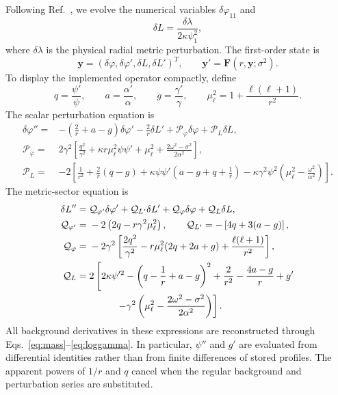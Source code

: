 \documentclass[aps,prd,preprint,onecolumn,nofootinbib,superscriptaddress,showkeys]{revtex4-2}
\newcommand{\sigmatwo}{\sigma^{2}}
\begin{document}
Following Ref.~\cite{Alcubierre2021}, we evolve the numerical variables $\delta\varphi_{11}$ and
\begin{equation}
\delta L=\frac{\delta\lambda}{2\kappa\psi_{1}^{2}},
\end{equation}
where $\delta\lambda$ is the physical radial metric perturbation. The first-order state is
\begin{equation}
\bm{y}=(\delta\varphi,\delta\varphi',\delta L,\delta L')^{T},
\qquad
\bm{y}'=\bm{F}(r,\bm{y};\sigmatwo).
\label{eq:firstorder}
\end{equation}
To display the implemented operator compactly, define
\begin{equation}
q=\frac{\psi'}{\psi},
\qquad
a=\frac{\alpha'}{\alpha},
\qquad
g=\frac{\gamma'}{\gamma},
\qquad
\mu_{\ell}^{2}=1+\frac{\ell(\ell+1)}{r^{2}}.
\label{eq:radial-shorthand}
\end{equation}
The scalar perturbation equation is
\begin{align}
\delta\varphi''={}&-\left(\frac{2}{r}+a-g\right)\delta\varphi'
-\frac{2}{r}\delta L'
+\mathcal{P}_{\varphi}\delta\varphi
+\mathcal{P}_{L}\delta L,
\label{eq:phi-full}\\
\mathcal{P}_{\varphi}={}&2\gamma^{2}\left[
\frac{q^{2}}{\gamma^{2}}+\kappa r\mu_{\ell}^{2}\psi\psi'
+\mu_{\ell}^{2}+\frac{2\omega^{2}-\sigmatwo}{2\alpha^{2}}
\right],
\label{eq:p-phi}\\
\mathcal{P}_{L}={}&-2\left[
\frac{1}{r^{2}}+\frac{2}{r}(q-g)
+\kappa\psi\psi'\left(a-g+q+\frac{1}{r}\right)
-\kappa\gamma^{2}\psi^{2}
\left(\mu_{\ell}^{2}-\frac{\omega^{2}}{\alpha^{2}}\right)
\right].
\label{eq:p-l}
\end{align}
The metric-sector equation is
\begin{align}
\delta L''={}&\mathcal{Q}_{\varphi'}\delta\varphi'
+\mathcal{Q}_{L'}\delta L'
+\mathcal{Q}_{\varphi}\delta\varphi
+\mathcal{Q}_{L}\delta L,
\label{eq:l-full}\\
\mathcal{Q}_{\varphi'}={}&-2\left(2q-r\gamma^{2}\mu_{\ell}^{2}\right),
\qquad
\mathcal{Q}_{L'}=-\left[4q+3(a-g)\right],
\label{eq:q-derivative}\\
\mathcal{Q}_{\varphi}={}&-2\gamma^{2}\left[
\frac{2q^{2}}{\gamma^{2}}
-r\mu_{\ell}^{2}(2q+2a+g)
+\frac{\ell(\ell+1)}{r^{2}}
\right],
\label{eq:q-phi}\\
\mathcal{Q}_{L}={}&2\left[
2\kappa\psi'^{2}
-\left(q-\frac{1}{r}+a-g\right)^{2}
+\frac{2}{r^{2}}-\frac{4a-g}{r}+g'\right.\nonumber\\
&\left.\hspace{2.8em}
-\gamma^{2}\left(
\mu_{\ell}^{2}-\frac{2\omega^{2}-\sigmatwo}{2\alpha^{2}}
\right)\right].
\label{eq:q-l}
\end{align}
All background derivatives in these expressions are reconstructed through Eqs.~\eqref{eq:mass}--\eqref{eq:loggamma}. In particular, $\psi''$ and $g'$ are evaluated from differential identities rather than from finite differences of stored profiles. The apparent powers of $1/r$ and $q$ cancel when the regular background and perturbation series are substituted.
\end{document}
